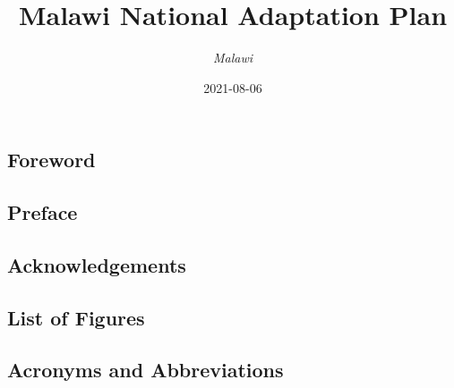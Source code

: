 \documentclass[
]{book}
\title{Malawi National Adaptation Plan}
\author{\emph{Malawi}}
\date{2021-08-06}
\begin{document}
\maketitle

{
\setcounter{tocdepth}{1}
\tableofcontents
}
\hypertarget{section}{%
\chapter{}\label{section}}

\hypertarget{foreword}{%
\section{Foreword}\label{foreword}}

\hypertarget{preface}{%
\section{Preface}\label{preface}}

\hypertarget{acknowledgements}{%
\section{Acknowledgements}\label{acknowledgements}}

\hypertarget{list-of-figures}{%
\section{List of Figures}\label{list-of-figures}}

\hypertarget{acronyms-and-abbreviations}{%
\section{Acronyms and Abbreviations}\label{acronyms-and-abbreviations}}

\providecommand{\docline}[3]{\noalign{\global\setlength{\arrayrulewidth}{#1}}\arrayrulecolor[HTML]{#2}\cline{#3}}

\setlength{\tabcolsep}{2pt}

\renewcommand*{\arraystretch}{1.5}
\end{document}
